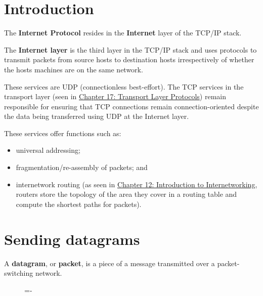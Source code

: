 \documentclass[a4paper]{systems-software}
\begin{document}
\section{Introduction}

The \textbf{Internet Protocol} resides in the \textbf{Internet} layer of the TCP/IP stack.

The \textbf{Internet layer} is the third layer in the TCP/IP stack and uses protocols to transmit packets from source hosts to destination hosts irrespectively of whether the hosts machines are on the same network.

These services are UDP (connectionless best-effort). The TCP services in the transport layer (seen in \hyperref[chap:17]{Chapter 17: Transport Layer Protocols}) remain responsible for ensuring that TCP connections remain connection-oriented despite the data being transferred using UDP at the Internet layer.

These services offer functions such as:
\begin{itemize}
	\item universal addressing;
	\item fragmentation/re-assembly of packets; and
	\item internetwork routing (as seen in \hyperref[chap:17]{Chapter 12: Introduction to Internetworking}, routers store the topology of the area they cover in a routing table and compute the shortest paths for packets).
\end{itemize}


\newpage

\section{Sending datagrams}
\label{sec:sending_datagrams}

A \textbf{datagram}, or \textbf{packet}, is a piece of a message transmitted over a packet-switching network.

\begin{figure}[H]
	\lineskip=-\fboxrule
\end{figure}
\end{document}
